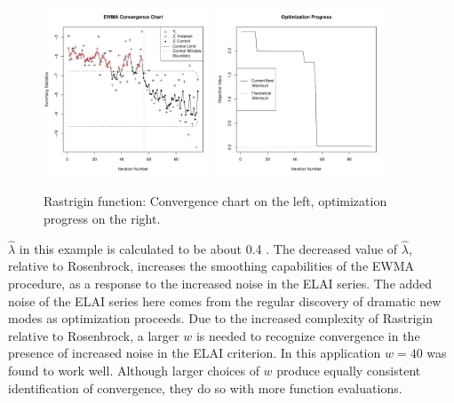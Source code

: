 \documentclass[12pt]{article}
\def \rastLamb {
        0.4
}
\begin{document}
%
%
\begin{figure}[!htb]
        \centering
        \includegraphics[width=0.45\textwidth]{./figures/ewmaConvChartRastHardBW.pdf}
        \includegraphics[width=0.45\textwidth]{./figures/bestZRastHardEnd.pdf}
        \caption{Rastrigin function: Convergence chart on the left, optimization progress on the right.}
        \label{fig:rastrigin}
\end{figure}
%
%

%
$\hat\lambda$ in this example is calculated to be about \rastLamb.
%
The decreased value of $\hat\lambda$, relative to Rosenbrock, increases the smoothing capabilities of the EWMA procedure, as a response to the increased noise in the ELAI series. %
%
The added noise of the ELAI series here comes from the regular discovery of dramatic new modes as optimization proceeds.
%
Due to the increased complexity of Rastrigin relative to Rosenbrock, a larger $w$ is needed to recognize convergence in the presence of increased noise in the ELAI criterion. 
%
In this application $w=40$ was found to work well.
%
Although larger choices of $w$ produce equally consistent identification of convergence, they do so with more function evaluations.
\end{document}
